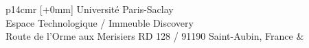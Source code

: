 \begin{mdframed}[linecolor=Prune,linewidth=1]
\begin{small}
\begin{multicols}{2}

\end{multicols}
\end{small}
\end{mdframed}

\vspace{3cm} %
\selectfont
\begin{tabular}{p{14cm}r}
[+0mm]{{\color{Prune} Université Paris-Saclay\\
Espace Technologique / Immeuble Discovery\\
Route de l’Orme aux Merisiers RD 128 / 91190 Saint-Aubin, France}} & \\
\end{tabular}
